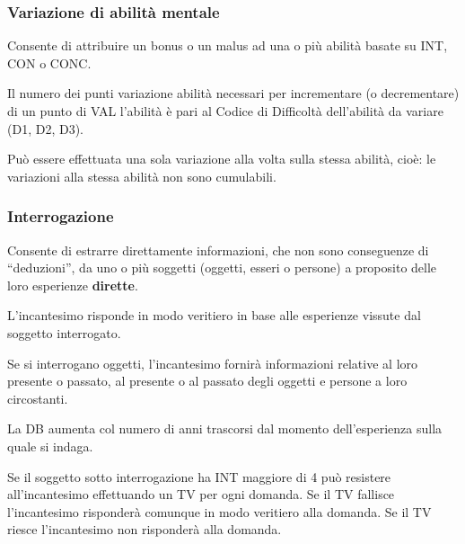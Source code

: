 \subsubsection{Variazione di abilit\`a mentale} 

Consente di attribuire un bonus o un malus ad una o pi\`u abilit\`a
basate su INT, CON o CONC.

Il numero dei punti variazione abilit\`a necessari per incrementare
(o decrementare) di un punto di VAL l'abilit\`a \`e pari al Codice
di Difficolt\`a dell'abilit\`a da variare (D1, D2, D3).

Pu\`o essere effettuata una sola variazione alla volta sulla stessa
abilit\`a, cio\`e: le variazioni alla stessa abilit\`a non sono
cumulabili.




\subsubsection{Interrogazione}  

Consente di estrarre direttamente informazioni, che non sono
conseguenze di ``deduzioni'', da uno o pi\`u soggetti (oggetti, esseri
o persone) a proposito delle loro esperienze \textbf{dirette}.

L'incantesimo risponde in modo veritiero in base alle esperienze
vissute dal soggetto interrogato.

Se si interrogano oggetti, l'incantesimo fornir\`a informazioni
relative al loro presente o passato, al presente o al passato degli
oggetti e persone a loro circostanti.

La DB aumenta col numero di anni trascorsi dal momento dell'esperienza
sulla quale si indaga.

Se il soggetto sotto interrogazione ha INT maggiore di 4 pu\`o
resistere all'incantesimo effettuando un TV per ogni domanda. Se il TV
fallisce l'incantesimo risponder\`a comunque in modo veritiero alla
domanda. Se il TV riesce l'incantesimo non risponder\`a alla domanda.

